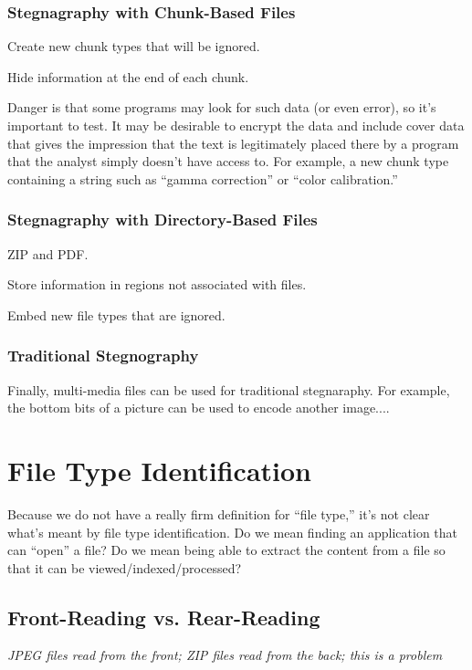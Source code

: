 \subsubsection{Stegnagraphy with Chunk-Based Files}
Create new chunk types that will be ignored.

Hide information at the end of each chunk.

Danger is that some programs may look for such data (or even error),
so it's important to test. It may be desirable to encrypt the data and
include cover data that gives the impression that the text is
legitimately placed there by a program that the analyst simply doesn't
have access to. For example, a new chunk type containing a string such
as ``gamma correction'' or ``color calibration.''

\subsubsection{Stegnagraphy with Directory-Based Files}

ZIP and PDF.

Store information in regions not associated with files.

Embed new file types that are ignored.

\subsubsection{Traditional Stegnography}
Finally, multi-media files can be used for traditional
stegnaraphy. For example, the bottom bits of a picture can be used to
encode another image....



\section{File Type Identification}

Because we do not have a really firm definition for ``file type,''
it's not clear what's meant by file type identification. Do we mean
finding an application that can ``open'' a file? Do we mean being able
to extract the content from a file so that it can be viewed/indexed/processed?

\subsection{Front-Reading vs. Rear-Reading}

\emph{JPEG files read from the front; ZIP files read from the back;
  this is a problem}


